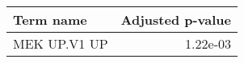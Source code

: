 \begin{tabular}{lr}
\toprule
    Term name &  Adjusted p-value \\
\midrule
 MEK UP.V1 UP &          1.22e-03 \\
\bottomrule
\end{tabular}
